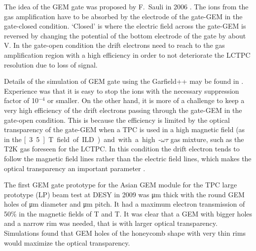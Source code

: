 The idea of the GEM gate was proposed by F.~Sauli in 2006 \cite{Sauli2006269}.
The ions from the gas amplification have to be absorbed by the electrode of the gate-GEM in the gate-closed condition.
`Closed' is where the electric field across the gate-GEM is reversed by changing the potential of the bottom
electrode of the gate by about \unit[10]{V}. In the gate-open condition the drift electrons need to reach
to the gas amplification region with a high efficiency in order to not deteriorate the LCTPC resolution
due to loss of signal.

Details of the simulation of GEM gate using the Garfield++ may be found in \cite{LC-DET-2012-079}. Experience was that it is easy
to stop the ions with the necessary suppression factor of 10$^{-4}$ or smaller. On the other hand, it is more
of a challenge to keep a very high efficiency of the drift electrons passing through the gate-GEM in the gate-open
condition. This is because the efficiency is limited by the optical transparency of the gate-GEM when a TPC
is used in a high magnetic field (as in the \unit[3.5]{T} field of ILD) and with a high-$\omega\tau$ gas mixture,
such as the T2K gas \cite{Behnke:2013lya,ref4T2Kgas_ishikawa,Kobayashi201137,Kobayashi2013122} foreseen for the LCTPC. In this condition the drift electron tends to follow the
magnetic field lines rather than the electric field lines, which makes the optical transparency an important parameter .

The first GEM gate prototype for the Asian GEM module for the TPC large prototype (LP) beam test at
DESY in 2009 was \unit[14]{\micro m} thick with the round GEM holes of
\unit[90]{\micro m} diameter and \unit[140]{\micro m} pitch. It had a maximum electron
transmission of 50\% in the magnetic fields of \unit[1]{T} and \unit[0]{T}. It was clear that a GEM
with bigger holes and a narrow rim was needed, that is with larger optical transparency. Simulations found that
GEM holes of the honeycomb shape with very thin rims would maximize the optical transparency.

